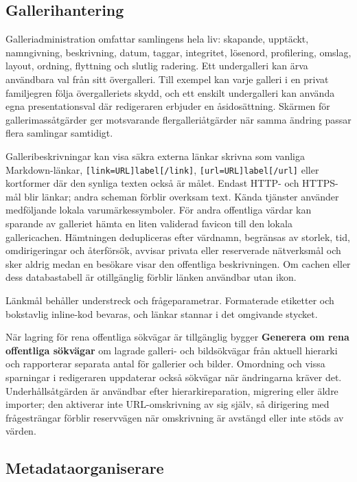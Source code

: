 \documentclass[11pt,a4paper]{article}
\newcommand{\ui}[1]{\textbf{#1}}
\newcommand{\codeword}[1]{\nolinkurl{#1}}
\begin{document}
\subsection{Gallerihantering}

Galleriadministration omfattar samlingens hela liv: skapande, upptäckt,
namngivning, beskrivning, datum, taggar, integritet, lösenord, profilering,
omslag, layout, ordning, flyttning och slutlig radering. Ett undergalleri kan
ärva användbara val från sitt övergalleri. Till exempel kan varje galleri i en
privat familjegren följa övergalleriets skydd, och ett enskilt undergalleri kan
använda egna presentationsval där redigeraren erbjuder en åsidosättning. Skärmen
för gallerimassåtgärder ger motsvarande flergalleriåtgärder när samma ändring
passar flera samlingar samtidigt.

Galleribeskrivningar kan visa säkra externa länkar skrivna som vanliga
Markdown-länkar, \codeword{[link=URL]label[/link]},
\codeword{[url=URL]label[/url]} eller kortformer där den synliga texten också är
målet. Endast HTTP- och HTTPS-mål blir länkar; andra scheman förblir overksam
text. Kända tjänster använder medföljande lokala varumärkessymboler. För andra
offentliga värdar kan sparande av galleriet hämta en liten validerad favicon
till den lokala gallericachen. Hämtningen dedupliceras efter värdnamn, begränsas
av storlek, tid, omdirigeringar och återförsök, avvisar privata eller
reserverade nätverksmål och sker aldrig medan en besökare visar den offentliga
beskrivningen. Om cachen eller dess databastabell är otillgänglig förblir länken
användbar utan ikon.

Länkmål behåller understreck och frågeparametrar. Formaterade etiketter och
bokstavlig inline-kod bevaras, och länkar stannar i det omgivande stycket.

När lagring för rena offentliga sökvägar är tillgänglig bygger \ui{Generera om
rena offentliga sökvägar} om lagrade galleri- och bildsökvägar från aktuell
hierarki och rapporterar separata antal för gallerier och bilder. Omordning och
vissa sparningar i redigeraren uppdaterar också sökvägar när ändringarna kräver
det. Underhållsåtgärden är användbar efter hierarkireparation, migrering eller
äldre importer; den aktiverar inte URL-omskrivning av sig själv, så dirigering
med frågesträngar förblir reservvägen när omskrivning är avstängd eller inte
stöds av värden.
\subsection{Metadataorganiserare}
\end{document}
